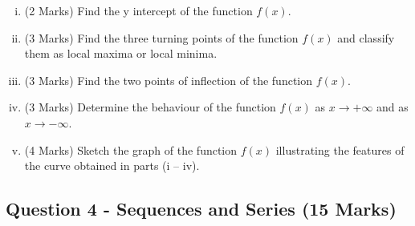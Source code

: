 ﻿ \documentclass[a4paper,12pt]{article}
\begin{document}
\begin{enumerate}[(i)]
	\item (2 Marks) Find the y intercept of the function $f(x)$.
	\item (3 Marks) Find the three turning points of the function $f(x)$ and classify them as local
	maxima or local minima.
	\item (3 Marks)  Find the two points of inflection of the function $f(x)$.
	
	\item (3 Marks)  Determine the behaviour of the function $f(x)$ as $x \rightarrow + \infty$ and as $x \rightarrow - \infty $.
	\item (4 Marks) Sketch the graph of the function $f(x)$ illustrating the features of the curve obtained
	in parts (i – iv). 
\end{enumerate}



\subsection*{Question 4 - Sequences and Series (15 Marks)}

\end{document}
